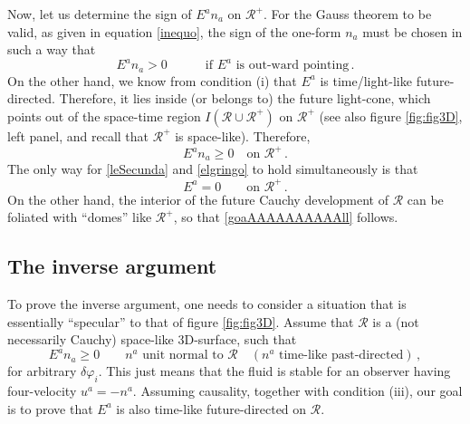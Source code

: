 \documentclass[aps,prl,reprint,nofootinbib]{revtex4-1}
\newcommand{\spc}{\quad \quad \quad}
\begin{document}
Now, let us determine the sign of $E^a n_a$ on $\mathcal{R}^+$. For the Gauss theorem to be valid, as given in equation \eqref{inequo}, the sign of the one-form $n_a$ must be chosen in such a way that \cite{DrayDivergence1994,Hawking1973,FengConserved2018}
\begin{equation}\label{gbuz}
E^a n_a >0  \spc \text{if }E^a\text{ is out-ward pointing} \, .
\end{equation}
On the other hand, we know from condition (i) that $E^a$ is time/light-like future-directed. Therefore, it lies inside (or belongs to) the future light-cone, which points out of the space-time region $I(\mathcal{R} \cup \mathcal{R}^+)$ on $\mathcal{R}^+$ (see also figure \ref{fig:fig3D}, left panel, and recall that $\mathcal{R}^+$ is space-like). Therefore,
\begin{equation}\label{elgringo}
E^a n_a \geq 0 \quad \text{on }\mathcal{R}^+ \, .
\end{equation} 
The only way for \eqref{leSecunda} and \eqref{elgringo} to hold simultaneously is that 
\begin{equation}
E^a =0 \quad \quad \text{on }\mathcal{R}^+ \, .
\end{equation}
On the other hand, the interior of the future Cauchy development of $\mathcal{R}$ can be foliated with ``domes'' like $\mathcal{R}^+$, so that \eqref{goaAAAAAAAAAAll} follows.

\subsection{The inverse argument}

To prove the inverse argument, one needs to consider a situation that is essentially ``specular'' to that of figure \ref{fig:fig3D}. Assume that $\mathcal{R}$ is a (not necessarily Cauchy) space-like 3D-surface, such that 
\begin{equation}\label{condizion}
E^a n_a \geq 0  \quad \quad n^a\text{ unit normal to }\mathcal{R}  \quad (n^a \text{ time-like past-directed}) \, ,
\end{equation} 
for arbitrary $\delta \varphi_i$. This just means that the fluid is stable for an observer having four-velocity $u^a =-n^a$. Assuming causality, together with condition (iii), our goal is to prove that $E^a$ is also time-like future-directed on $\mathcal{R}$.
\end{document}
